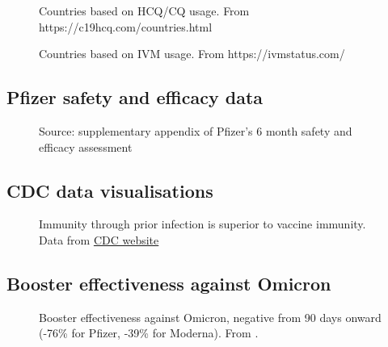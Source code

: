 \documentclass[11pt,a4paper,notitlepage]{report}
\begin{document}
\begin{figure}[h]
    \centering
    \caption{Countries based on HCQ/CQ usage. From https://c19hcq.com/countries.html}
    \label{fig:hydroxychloroquine-countries}
\end{figure}

\begin{figure}[h]
    \centering
    \caption{Countries based on IVM usage. From https://ivmstatus.com/}
    \label{fig:ivermectin-countries}
\end{figure}

\clearpage

\subsection*{Pfizer safety and efficacy data}

\begin{figure}[h]
    \centering
    \caption{Source: supplementary appendix \cite{doi:10.1056/NEJMoa2110345-appendix} of Pfizer's 6 month safety and efficacy assessment \cite{doi:10.1056/NEJMoa2110345}}
    \label{fig:Pfizer-6-month-appendix}
\end{figure}

\clearpage

\subsection*{CDC data visualisations}

\begin{figure}[h]
    \centering
    \caption{Immunity through prior infection is superior to vaccine immunity. Data from \href{https://www.cdc.gov/mmwr/volumes/71/wr/mm7104e1.htm}{CDC website} \cite{cdc28012020}}
    \label{fig:CDC-natural-immunity}
\end{figure}

\clearpage

\subsection*{Booster effectiveness against Omicron}

\begin{figure}[h]
    \centering
    \caption{Booster effectiveness against Omicron, negative from 90 days onward (-76\% for Pfizer, -39\% for Moderna). From \citet{Hansen2021.12.20.21267966}.}
    \label{fig:Omicron-vaccine}
\end{figure}
\end{document}
